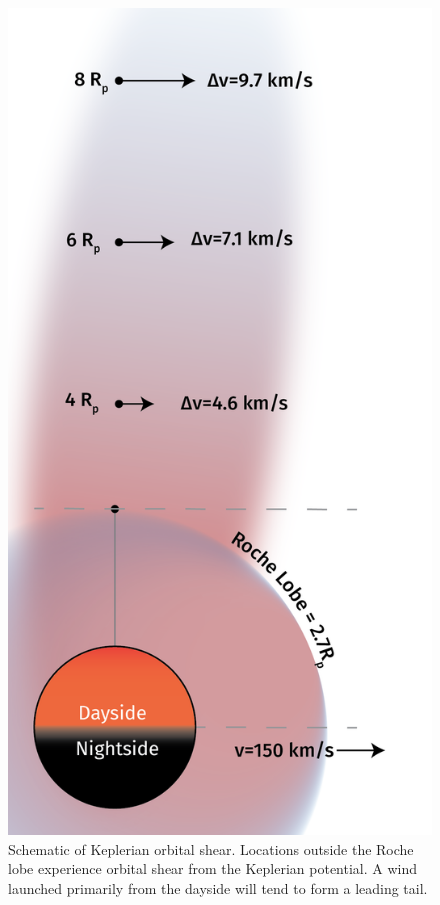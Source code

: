 \documentclass[twocolumn]{aastex631}
\begin{document}
\begin{figure}
    \includegraphics[width=0.8\linewidth]{figures/KeplerianShear_v0p3.png}
    \caption{Schematic of Keplerian orbital shear.  Locations outside the Roche lobe experience orbital shear from the Keplerian potential.  A wind launched primarily from the dayside will tend to form a leading tail.}
    \label{fig:KeplerianShear}
\end{figure}
\end{document}
